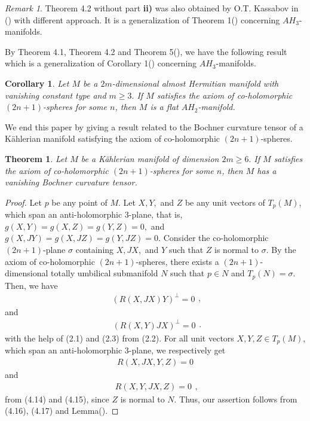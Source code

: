 \documentclass{amsart}
\newtheorem{theorem}{Theorem}[section]
\newtheorem*{theorem A}{Theorem A}
\newtheorem*{theorem B}{N\"olker's Theorem}
\newtheorem{corollary}{Corollary}[section]
\theoremstyle{remark}
\newtheorem{remark}{Remark}[section]
\theoremstyle{remark}
\theoremstyle{definition}
\numberwithin{equation}{section}
\begin{document}
\begin{remark}
Theorem 4.2 without part \textbf{ii)} was also obtained by O.T.
Kassabov in (\cite{Kass}) with different approach. It is a
generalization of Theorem 1(\cite{Vanh}) concerning
$AH_{3}$-manifolds.
\end{remark}
By Theorem 4.1, Theorem 4.2 and Theorem 5(\cite{Van}), we have the
following result which is a generalization of Corollary
1(\cite{Vanh}) concerning  $AH_{3}$-manifolds.
\begin{corollary} Let $M$ be a $2m$-dimensional almost Hermitian manifold with
vanishing constant type and $m\geq3.$ If $M$ satisfies the axiom of
co-holomorphic $(2n+1)$-spheres for some $n$, then $M$ is a flat
$AH_{2}$-manifold.
\end{corollary}
We end this paper by giving a result related to the Bochner
curvature tensor of a K\"{a}hlerian manifold satisfying the axiom of
co-holomorphic $(2n+1)$-spheres.
\begin{theorem}
Let $M$ be a K\"{a}hlerian manifold of dimension $2m\geq6.$ If $M$
satisfies the axiom of co-holomorphic $(2n+1)$-spheres for some $n$,
then $M$ has a vanishing Bochner curvature tensor.
\end{theorem}
\begin{proof} Let $p$ be any point of $M$. Let $X,Y,$ and $Z$  be any unit vectors
of $T_{p}(M)$, which span an anti-holomorphic 3-plane, that is,
$g(X,Y)=g(X,Z)=g(Y,Z)=0,$ and $g(X,JY)=g(X,JZ)=g(Y,JZ)=0.$ Consider
the co-holomorphic $(2n+1)$-plane $\sigma$ containing $X,JX,$ and
$Y$ such that $Z$ is normal to $\sigma$. By the axiom of
co-holomorphic $(2n+1)$-spheres,  there exists a
$(2n+1)$-dimensional totally umbilical submanifold $N$ such that
$p\in N$ and $T_{p}(N)=\sigma.$ Then, we have
\begin{equation}
\label{e1}
\begin{array}{c}
(R(X,JX)Y)^{\bot}=0
\end{array},
\end{equation}
and
\begin{equation}
\label{e1}
\begin{array}{c}
(R(X,Y)JX)^{\bot}=0
\end{array}.
\end{equation}
 with the help of (2.1) and
(2.3) from (2.2). For all unit vectors $X,Y,Z\in T_{p}(M)$, which
span an anti-holomorphic 3-plane, we respectively get
\begin{equation}
\label{e1}
\begin{array}{c}
R(X,JX,Y,Z)=0
\end{array}
\end{equation}
and
\begin{equation}
\label{e1}
\begin{array}{c}
R(X,Y,JX,Z)=0
\end{array},
\end{equation}
from (4.14) and (4.15), since $Z$ is normal to $N$. Thus, our
assertion follows from (4.16), (4.17) and Lemma(\cite{Kassa}).
\end{proof}
\end{document}
